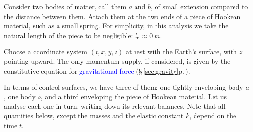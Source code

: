 \documentclass[a4paper,12pt,%
onecolumn,oneside,%
british%
]{memoir}
\renewcommand*{\|}[1][]{\nonscript\:#1\vert\nonscript\:\mathopen{}}
\newcommand*{\sect}{\S}%
\renewcommand*{\autoref}[3][\sect\,\ref]{\textcolor{blue}{#3} {\color{blue}\scriptsize(\faIcon[regular]{eye}\;#1{#2}\;p.\,\pageref{#2})}}
\newcommand*{\ylo}{l_{\textrm{n}}}
\begin{document}
\medskip

Consider two bodies of matter, call them $a$ and $b$, of small extension compared to the distance between them. Attach them at the two ends of a piece of Hookean material, such as a small spring. For simplicity, in this analysis we take the natural length of the piece to be negligible: $\ylo \approx \qty{0}{m}$.

Choose a coordinate system $(t,x,y,z)$ at rest with the Earth's surface, with $z$ pointing upward. The only momentum supply, if considered, is given by the constitutive equation for \autoref{sec:gravity}{gravitational force}.

In terms of control surfaces, we have three of them: one tightly enveloping body $a$, one body $b$, and a third enveloping the piece of Hookean material. Let us analyse each one in turn, writing down its relevant balances. Note that all quantities below, except the masses and the elastic constant $k$, depend on the time $t$.
\end{document}
